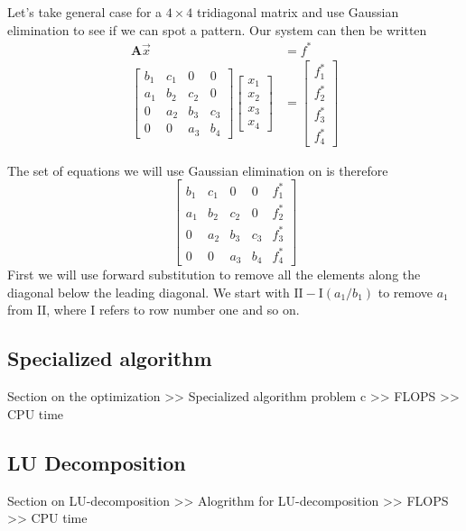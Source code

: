 \documentclass[10pt, a4paper]{amsart}
\begin{document}
Let's take general case for a $4\times 4$ tridiagonal matrix and use Gaussian elimination to see if we can spot a pattern.
Our system can then be written 
\begin{align}
	\mathbf{A}\vec{x} &= f^*\nonumber\\
	\begin{bmatrix}
		b_1 & c_1 & 0 & 0\\
		a_1 & b_2 & c_2 & 0\\
		0 & a_2 & b_3 & c_3 \\
		0 & 0 & a_3 & b_4 
	\end{bmatrix}
	\begin{bmatrix}
		x_1\\
		x_2\\
		x_3\\
		x_4
	\end{bmatrix}
	&= 
	\begin{bmatrix}
		f^*_1\\
		f^*_2\\
		f^*_3\\
		f^*_4
	\end{bmatrix}
\end{align}

The set of equations we will use Gaussian elimination on is therefore 
\begin{equation}
 \left[
  \begin{array}{cccc|c}
	b_1 & c_1 & 0 & 0 & f^*_1\\
	a_1 & b_2 & c_2 & 0 & f^*_2\\
	0 & a_2 & b_3 & c_3 & f^*_3\\
	0 & 0 & a_3 & b_4 & f^*_4
  \end{array}
 \right]
\end{equation}
First we will use forward substitution to remove all the elements along the diagonal below the leading diagonal. We start with $\textrm{II} - \textrm{I}(a_1/b_1)$ to remove $a_1$ from $\textrm{II}$, where \textrm{I} refers to row number one and so on. 
\subsection{Specialized algorithm}
Section on the optimization
>> Specialized algorithm problem c >> FLOPS >> CPU time
\subsection{LU Decomposition}
Section on LU-decomposition
>> Alogrithm for LU-decomposition >> FLOPS >> CPU time
\end{document}
